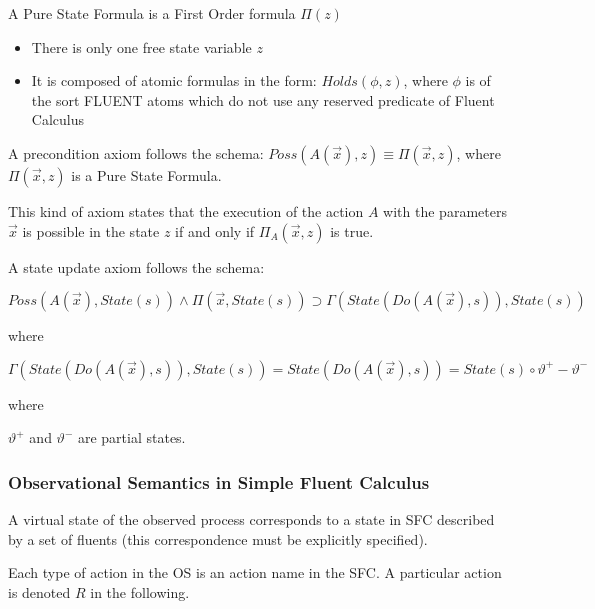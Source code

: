 \begin{definition}
A Pure State Formula is a First Order formula
$\Pi(z)$

\begin{itemize}
    \item There is only one free state variable $z$
	\item It is composed of atomic formulas in the form:
	\subitem $Holds(\phi, z)$, where $\phi$ is of the sort FLUENT
	\subitem atoms which do not use any reserved predicate of Fluent Calculus 
\end{itemize}

\end{definition}

\begin{definition}
A precondition axiom follows the schema: $Poss(A(\vec{x}), z) \equiv
\Pi(\vec{x}, z)$, where $\Pi(\vec{x}, z)$ is a Pure State Formula.
\end{definition}

This kind of axiom states that the execution of the action $A$ with the
parameters $\vec{x}$ is possible in the state $z$ if and only if $\Pi_A(\vec{x},
z)$ is true.



\begin{definition}
A state update axiom follows the schema:

$Poss(A(\vec{x}), State(s)) \land \Pi(\vec{x}, State(s)) \supset \Gamma(State(Do(A(\vec{x}), s)), State(s))$


where

$\Gamma(State(Do(A(\vec{x}), s)), State(s)) = State(Do(A(\vec{x}), s)) = State(s) \circ \vartheta^{+} - \vartheta^{-}$


where

$\vartheta^{+}$ and $\vartheta^{-}$ are partial states.
\end{definition}


\subsubsection{Observational Semantics in Simple Fluent Calculus}
\label{sec:obssemSfc}

\vspace{2mm}
A virtual state of the observed process corresponds to a state in SFC described by a set of fluents (this correspondence must be explicitly specified).

Each type of action in the OS is an action name in the SFC. A particular action is denoted $R$ in the following.


